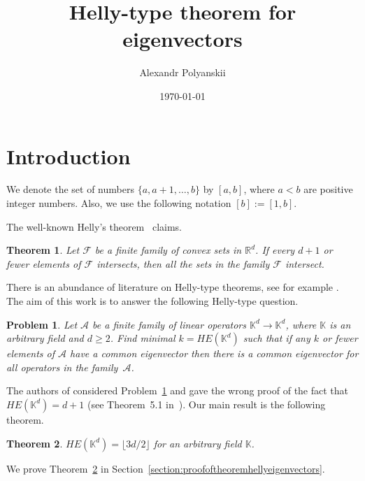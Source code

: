 \documentclass[12pt,nopagetitle]{article}
\author{Alexandr Polyanskii}
\title{Helly-type theorem for eigenvectors}
\date{\today}
\theoremstyle{plain}
\newtheorem{theorem}{Theorem}
\newtheorem{problem}{Problem}
\theoremstyle{definition}
\begin{document}
\maketitle
{}
	
 \section{Introduction}
	We denote the set of numbers $\{a,a+1,\dots, b\}$ by $[a,b]$, where $a<b$ are positive integer numbers. Also, we use the following notation $[b]:=[1,b]$.
    
The well-known Helly's theorem~\cite{Helly} claims.
\begin{theorem}
\label{theorem:helly}
Let $\mathcal F$ be a finite family of convex sets in $\mathbb R^d$. If every $d + 1$ or fewer elements of $\mathcal F$ intersects, then all the sets in the family $\mathcal F$ intersect.
\end{theorem}

There is an abundance of literature on Helly-type theorems, see for example \cite{ALS, DGK63,Eck,Mat,W}. The aim of this work is to answer the following Helly-type question.
\begin{problem}
\label{problem:hellyeigenvectors}
Let $\mathcal{A}$ be a finite family of linear operators $\mathbb K^d\to \mathbb K^d$, where $\mathbb K$ is an arbitrary field and $d\geqslant 2$. Find minimal $k=HE(\mathbb K^d)$ such that if any $k$ or fewer elements of $\mathcal A$ have a common eigenvector then there is a common eigenvector for all operators in the family~$\mathcal{A}$. 
	\end{problem}	
The authors of \cite{B} considered Problem~\ref{problem:hellyeigenvectors} and gave the wrong proof of the fact that $HE(\mathbb K^d)=d+1$ (see Theorem~5.1 in~\cite{B}). Our main result is the following theorem.
\begin{theorem}
\label{theorem:hellyeigenvectors}
$HE(\mathbb K^d)=\lfloor3d/2\rfloor$ for an arbitrary field $\mathbb K$.
\end{theorem}
We prove Theorem~\ref{theorem:hellyeigenvectors} in Section~\ref{section:proofoftheoremhellyeigenvectors}.
\end{document}
